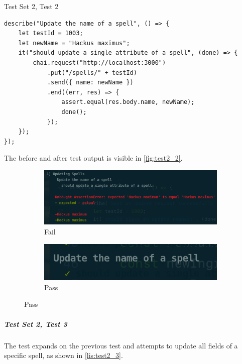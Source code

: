\begin{listing}[h]
\caption{Test Set 2, Test 2}
\label{lis:test2_2}
\begin{verbatim}
describe("Update the name of a spell", () => {
	let testId = 1003;
	let newName = "Hackus maximus";
	it("should update a single attribute of a spell", (done) => {
		chai.request("http://localhost:3000")
			.put("/spells/" + testId)
			.send({ name: newName })
			.end((err, res) => {
				assert.equal(res.body.name, newName);
				done();
			});
	});
});
\end{verbatim}
\end{listing}

The before and after test output is visible in \autoref{fig:test2_2}.

\begin{figure}[h]
\caption{Test output for test set 2, test 2}
\label{fig:test2_2}
	\centering
	\begin{subfigure}[b]{0.5\textwidth}
		\centering
		\includegraphics[width=\textwidth]{images/22_fail}
		\caption{Fail}
		\label{fig:test22_fail}
	\end{subfigure}
	\hfill
	\begin{subfigure}[b]{0.5\textwidth}
		\centering
		\includegraphics[width=\textwidth]{images/22_pass}
		\caption{Pass}
		\label{fig:test22_pass}
	\end{subfigure}
\end{figure}


\subparagraph{Test Set 2, Test 3} The test expands on the previous test and attempts to update all fields of a specific spell, as shown in \autoref{lis:test2_3}.

